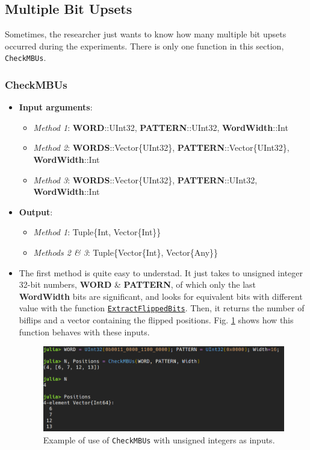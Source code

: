 \subsection{Multiple Bit Upsets} \label{SubSeC:MBUs}
%
Sometimes, the researcher just wants to know how many multiple bit upsets occurred during the experiments. There is only one function in this section, \texttt{CheckMBUs}.

\subsubsection*{CheckMBUs}

\begin{itemize}
	\item \textbf{Input arguments}:
	\begin{itemize}
		\item \textit{Method 1}: \textbf{WORD}::UInt32, \textbf{PATTERN}::UInt32, \textbf{WordWidth}::Int
		\item \textit{Method 2}: \textbf{WORDS}::Vector\{UInt32\}, \textbf{PATTERN}::Vector\{UInt32\}, \textbf{WordWidth}::Int
		\item \textit{Method 3}:  \textbf{WORDS}::Vector\{UInt32\}, \textbf{PATTERN}::UInt32, \textbf{WordWidth}::Int
	\end{itemize}
	\item \textbf{Output}: 
		\begin{itemize}
			\item \textit{Method 1}: Tuple\{Int, Vector\{Int\}\}
			\item \textit{Methods 2 \& 3}: Tuple\{Vector\{Int\}, Vector\{Any\}\}
		\end{itemize}
	\item The first method is quite easy to understad. It just takes to unsigned integer 32-bit numbers, \textbf{WORD} \& \textbf{PATTERN}, of which only the last \textbf{WordWidth} bits are significant, and looks for equivalent bits with different value with the function \hyperref[Func:ExtractFlippedBits]{\texttt{ExtractFlippedBits}}. Then, it returns the number of biflips and a vector containing the flipped positions. Fig. \ref{fig:Example_CheckMBUs_M1} shows how this function behaves with these inputs.
	
	\begin{figure}[h!]
		\centering
		\includegraphics[width=0.75\columnwidth]{fig/functions/CheckMBUs_M1.png}
		\caption{Example of use of \texttt{CheckMBUs} with unsigned integers as inputs.}
		\label{fig:Example_CheckMBUs_M1}
	\end{figure}


\end{itemize}
